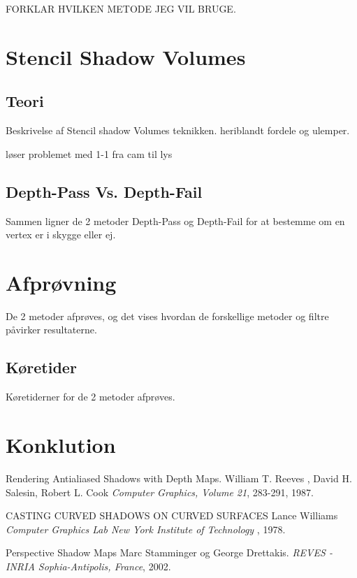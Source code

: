 \documentclass[11pt,a4paper]{article}
\begin{document}
FORKLAR HVILKEN METODE JEG VIL BRUGE.



\newpage 
\section{Stencil Shadow Volumes}

\subsection{Teori}
Beskrivelse af Stencil shadow Volumes teknikken. heriblandt fordele og ulemper.

løser problemet med 1-1 fra cam til lys

\subsection{Depth-Pass Vs. Depth-Fail}
Sammen ligner de 2 metoder Depth-Pass og Depth-Fail for at bestemme om en vertex er i skygge eller ej.


\section{Afprøvning}
 De 2 metoder afprøves, og det vises hvordan de forskellige metoder og filtre påvirker resultaterne.	

\subsection{Køretider}
Køretiderner for de 2 metoder afprøves.

\section{Konklution}



\newpage 

\begin{thebibliography}{100} %
 
\addtolength{\leftmargin}{0.2in} %
\setlength{\itemindent}{-0.2in} 

 Rendering Antialiased Shadows with Depth Maps.
  William T. Reeves , David H. Salesin, Robert L. Cook 
  \emph{Computer Graphics, Volume 21}, 283-291, 1987.
  
 CASTING CURVED SHADOWS ON CURVED SURFACES 
  Lance Williams
  \emph{Computer Graphics Lab New York Institute of Technology }, 1978.

 Perspective Shadow Maps 
  Marc Stamminger og George Drettakis.
  \emph{REVES - INRIA Sophia-Antipolis, France}, 2002.
    
  
  
\end{thebibliography} 
\end{document}
